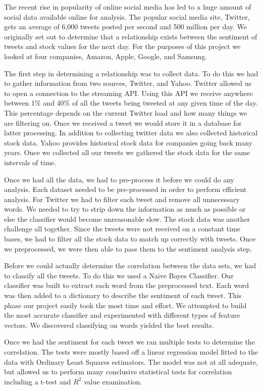 \documentclass{acm_proc_article-sp}
\begin{document}
The recent rise in popularity of online social media has led to a huge amount
of social data available online for analysis. The popular social media site,
Twitter, gets an average of 6,000 tweets posted per second and 500 million per
day. We originally set out to determine that a relationship exists between the
sentiment of tweets and stock values for the next day. For the purposes of
this project we looked at four companies, Amazon, Apple, Google, and Samsung. 

The first step in determining a relationship was to collect data. To do this we had to gather information
from two sources, Twitter, and Yahoo. Twitter allowed us to open a connection
to the streaming API. Using this API we receive anywhere between 1\% and 40\%
of all the tweets being tweeted at any given time of the day. This percentage depends on the current Twitter
load and how many things we are filtering on. Once we received a tweet we would
store it in a database for latter processing.  In addition to collecting
twitter data we also collected historical stock data. Yahoo provides historical
stock data for companies going back many years. Once we collected all our
tweets we gathered the stock data for the same intervals of time.

Once we had all the data, we had to pre-process it before we could do any
analysis. Each dataset needed to be pre-processed in order to perform
efficient analysis. For Twitter we had to filter each tweet and
remove all unnecessary words. We needed to try to strip down the information
as much as possible or else the classifier would become unreasonable slow. The
stock data was another challenge all together. Since the tweets were not
received on a constant time bases, we had to filter all the stock data to match
up correctly with tweets. Once we preprocessed, we were then able to pass them to
the sentiment analysis step.

Before we could actually determine the correlation between the data sets, we had
to classify all the tweets.  To do this we used a Naive Bayes Classifier. Our
classifier was built to extract each word from the preprocessed text. Each word
was then added to a dictionary to describe the sentiment of each tweet.
This phase our project easily took the most time and effort. We attempted to
build the most accurate classifier and experimented with different types of
feature vectors. We discovered classifying on words yielded the best results.

Once we had the sentiment for each tweet we ran multiple tests to determine the
correlation.  The tests were mostly based off a linear regression model fitted
to the data with Ordinary Least Squares estimators. The model was not at all
adequate, but allowed us to perform many conclusive statistical tests for
correlation including a t-test and $R^2$ value examination. 
\end{document}
